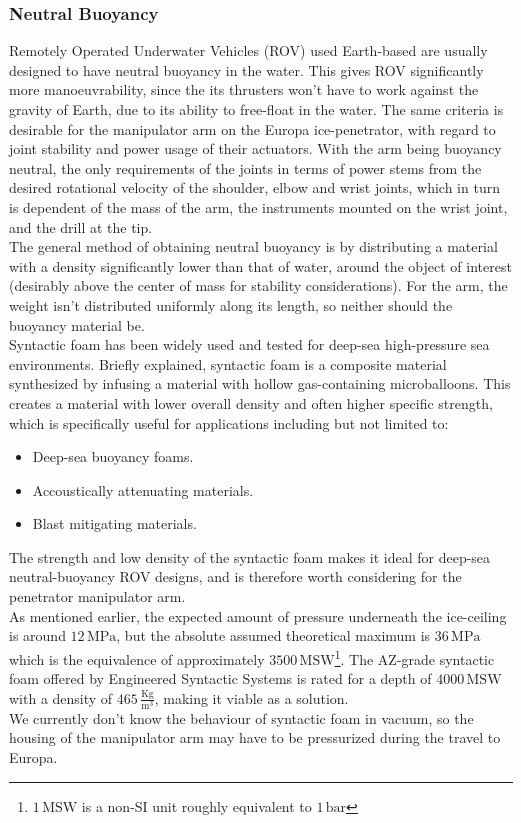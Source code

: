 \subsubsection{Neutral Buoyancy}
Remotely Operated Underwater Vehicles (ROV) used Earth-based are usually designed to have neutral buoyancy in the water. This gives ROV significantly more manoeuvrability, since the its thrusters won't have to work against the gravity of Earth, due to its ability to free-float in the water. The same criteria is desirable for the manipulator arm on the Europa ice-penetrator, with regard to joint stability and power usage of their actuators. With the arm being buoyancy neutral, the only requirements of the joints in terms of power stems from the desired rotational velocity of the shoulder, elbow and wrist joints, which in turn is dependent of the mass of the arm, the instruments mounted on the wrist joint, and the drill at the tip.\\
The general method of obtaining neutral buoyancy is by distributing a material with a density significantly lower than that of water, around the object of interest (desirably above the center of mass for stability considerations). For the arm, the weight isn't distributed uniformly along its length, so neither should the buoyancy material be.\\
Syntactic foam has been widely used and tested for deep-sea high-pressure sea environments. Briefly explained, syntactic foam is a composite material synthesized by infusing a material with hollow gas-containing microballoons. This creates a material with lower overall density and often higher specific strength, which is specifically useful for applications including but not limited to:
\begin{itemize}
\item Deep-sea buoyancy foams.
\item Accoustically attenuating materials.
\item Blast mitigating materials.
\end{itemize}
The strength and low density of the syntactic foam makes it ideal for deep-sea neutral-buoyancy ROV designs, and is therefore worth considering for the penetrator manipulator arm.\\
As mentioned earlier, the expected amount of pressure underneath the ice-ceiling is around $12\,\mathrm{MPa}$, but the absolute assumed theoretical maximum is $36\,\mathrm{MPa}$ which is the equivalence of approximately $3500\,\mathrm{MSW}$\footnote{$1\, \mathrm{MSW}$ is a non-SI unit roughly equivalent to $1\, \mathrm{bar}$}. The AZ-grade syntactic foam offered by Engineered Syntactic Systems is rated for a depth of $4000\,\mathrm{MSW}$ with a density of $465\,\mathrm{\frac{Kg}{m^3}}$, making it viable as a solution.\\
We currently don't know the behaviour of syntactic foam in vacuum, so the housing of the manipulator arm may have to be pressurized during the travel to Europa.


